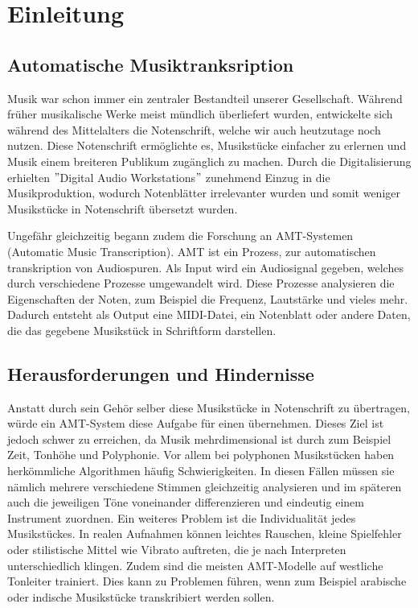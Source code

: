 \section{Einleitung}
\subsection{Automatische Musiktranksription}
Musik war schon immer ein zentraler Bestandteil unserer Gesellschaft.
Während früher musikalische Werke meist mündlich überliefert wurden,
entwickelte sich während des Mittelalters die Notenschrift, welche wir auch heutzutage noch nutzen.
Diese Notenschrift ermöglichte es, Musikstücke einfacher zu erlernen und Musik einem breiteren Publikum zugänglich zu machen.
Durch die Digitalisierung erhielten \("\)Digital Audio Workstations\("\) zunehmend Einzug in die Musikproduktion,
wodurch Notenblätter irrelevanter wurden und somit weniger Musikstücke in Notenschrift übersetzt wurden.

Ungefähr gleichzeitig begann zudem die Forschung an AMT-Systemen (Automatic Music Transcription).
AMT ist ein Prozess, zur automatischen transkription von Audiospuren.
Als Input wird ein Audiosignal gegeben, welches durch verschiedene Prozesse umgewandelt wird.
Diese Prozesse analysieren die Eigenschaften der Noten, zum Beispiel die Frequenz, Lautstärke und vieles mehr.
Dadurch entsteht als Output eine MIDI-Datei, ein Notenblatt oder andere Daten,
die das gegebene Musikstück in Schriftform darstellen.

\subsection{Herausforderungen und Hindernisse}
Anstatt durch sein Gehör selber diese Musikstücke in Notenschrift zu übertragen,
würde ein AMT-System diese Aufgabe für einen übernehmen.
Dieses Ziel ist jedoch schwer zu erreichen,
da Musik mehrdimensional ist durch zum Beispiel Zeit, Tonhöhe und Polyphonie.
Vor allem bei polyphonen Musikstücken haben herkömmliche Algorithmen häufig Schwierigkeiten.
In diesen Fällen müssen sie nämlich mehrere verschiedene Stimmen gleichzeitig analysieren und
im späteren auch die jeweiligen Töne voneinander differenzieren und eindeutig einem Instrument zuordnen.
Ein weiteres Problem ist die Individualität jedes Musikstückes.
In realen Aufnahmen können leichtes Rauschen,
kleine Spielfehler oder stilistische Mittel wie Vibrato auftreten,
die je nach Interpreten unterschiedlich klingen.
Zudem sind die meisten AMT-Modelle auf westliche Tonleiter trainiert.
Dies kann zu Problemen führen, wenn zum Beispiel
arabische oder indische Musikstücke transkribiert werden sollen.

